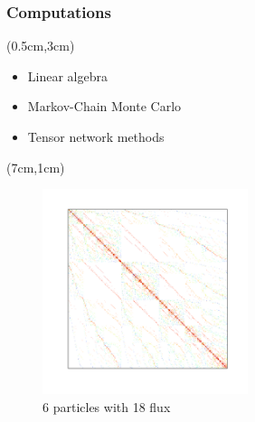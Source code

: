 \documentclass[xcolor=pdftex,dvipsnames]{beamer}
\begin{document}
\begin{frame}[t]
    \frametitle{Computations}
    \begin{textblock*}{6cm}(0.5cm,3cm) %
    \begin{itemize}
       \item Linear algebra 
       \item Markov-Chain Monte Carlo
       \item Tensor network methods
    \end{itemize}
    \end{textblock*}
    \begin{textblock*}{6cm}(7cm,1cm) %
      \begin{figure}
        \includegraphics[width=6cm]{N6_2s18_sparsity}
        \caption{6 particles with 18 flux}
      \end{figure}
    \end{textblock*}
\end{frame}
\end{document}

